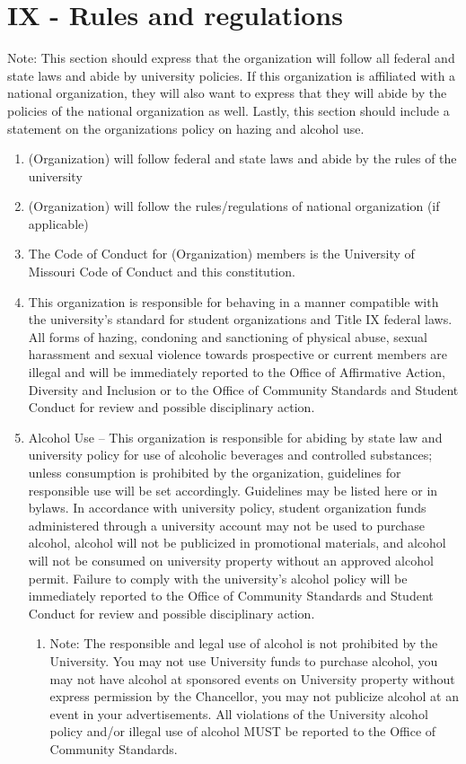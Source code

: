 \documentclass[11pt,a4paper,notitlepage]{article}
\begin{document}
\section*{IX - Rules and regulations}
Note:  This section should express that the organization will follow all federal
and state laws and abide by university policies.  If this organization is
affiliated with a national organization, they will also want to express that
they will abide by the policies of the national organization as well.  Lastly,
this section should include a statement on the organizations policy on hazing
and alcohol use.
\begin{enumerate}
\item (Organization) will follow federal and state laws and abide by the rules
of the university
\item (Organization) will follow the rules/regulations of national organization
(if applicable)
\item The Code of Conduct for (Organization) members is the University of
Missouri Code of Conduct and this constitution.
\item This organization is responsible for behaving in a manner compatible with
the university’s standard for student organizations and Title IX federal laws.
All forms of hazing, condoning and sanctioning of physical abuse, sexual
harassment and sexual violence towards prospective or current members are
illegal and will be immediately reported to the Office of Affirmative Action,
Diversity and Inclusion or to the Office of Community Standards and Student
Conduct for review and possible disciplinary action.
\item Alcohol Use – This organization is responsible for abiding by state law
and university policy for use of alcoholic beverages and controlled substances;
unless consumption is prohibited by the organization, guidelines for responsible
use will be set accordingly. {Guidelines may be listed here or in bylaws}. In
accordance with university policy, student organization funds administered
through a university account may not be used to purchase alcohol, alcohol will
not be publicized in promotional materials, and alcohol will not be consumed on
university property without an approved alcohol permit. Failure to comply with
the university’s alcohol policy will be immediately reported to the Office of
Community Standards and Student Conduct for review and possible disciplinary
action.
  \begin{enumerate}
    \item Note: The responsible and legal use of alcohol is not prohibited by
    the University. You may not use University funds to purchase alcohol, you
    may not have alcohol at sponsored events on University property without
    express permission by the Chancellor, you may not publicize alcohol at an
    event in your advertisements. All violations of the University alcohol
    policy and/or illegal use of alcohol MUST be reported to the Office of
    Community Standards. 
  \end{enumerate}
\end{enumerate}
\end{document}
